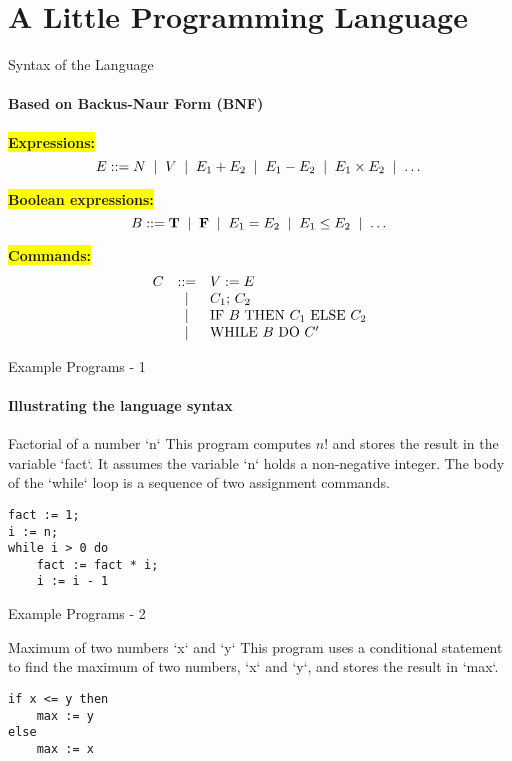 \section{A Little Programming Language}

\begin{frame}{Syntax of the Language}
    \framesubtitle{Based on Backus-Naur Form (BNF)}

    \colorbox{yellow}{\bfseries Expressions:}
    \[ E \mathrel{::=} N \;\mid\; V \;\mid\; E_1 + E_2 \;\mid\; E_1 - E_2 \;\mid\; E_1 \times E_2 \;\mid\; \dots \]

    \vspace{0.7cm}

    \colorbox{yellow}{\bfseries Boolean expressions:}
    \[ B \mathrel{::=} \mathbf{T} \;\mid\; \mathbf{F} \;\mid\; E_1=E_2 \;\mid\; E_1 \le E_2 \;\mid\; \dots \]

    \vspace{0.7cm}

    \colorbox{yellow}{\bfseries Commands:}
    \[
        \begin{array}{lcl}
            C & \mathrel{::=} & V := E \\
            & \;\mid\;  & C_1;\, C_2 \\
            & \;\mid\;  & \text{IF } B \text{ THEN } C_1 \text{ ELSE } C_2 \\
            & \;\mid\;  & \text{WHILE } B \text{ DO } C'
        \end{array}
    \]
\end{frame}

\begin{frame}[fragile]{Example Programs - 1}
    \framesubtitle{Illustrating the language syntax}

    \begin{block}{Factorial of a number `n`}
        This program computes $n!$ and stores the result in the variable `fact`. It assumes the variable `n` holds a non-negative integer. The body of the `while` loop is a sequence of two assignment commands.
        \begin{lstlisting}[language=pseudocode, numbers=none]
fact := 1;
i := n;
while i > 0 do
    fact := fact * i;
    i := i - 1
        \end{lstlisting}
    \end{block}

    \end{frame}
\begin{frame}[fragile]{Example Programs - 2}


    \begin{block}{Maximum of two numbers `x` and `y`}
        This program uses a conditional statement to find the maximum of two numbers, `x` and `y`, and stores the result in `max`.
        \begin{lstlisting}[language=pseudocode, numbers=none]
if x <= y then
    max := y
else
    max := x
        \end{lstlisting}
    \end{block}
\end{frame}

